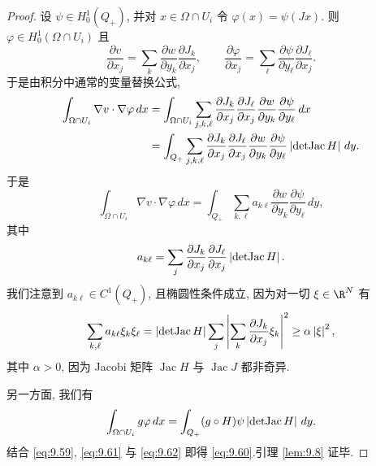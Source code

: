 \begin{proof}
设 $\psi\in H_0^1(Q_+)$, 并对 $x\in\Omega\cap U_i$ 令 $\varphi(x)=\psi(Jx)$.
则 $\varphi\in H_0^1(\Omega\cap U_i)$ 且
\begin{equation*}
\frac{\partial v}{\partial x_j}=\sum_k\frac{\partial w}{\partial y_k}
\frac{\partial J_k}{\partial x_j},\qquad
\frac{\partial\varphi}{\partial x_j}=\sum_\ell\frac{\partial\psi}{\partial y_\ell}
\frac{\partial J_\ell}{\partial x_j}.
\end{equation*}
于是由积分中通常的变量替换公式,
\begin{equation*}
\begin{aligned}
\int_{\Omega\cap U_i}\nabla v\cdot\nabla\varphi\,dx
&=\int_{\Omega\cap U_i}\sum_{j,k,\ell}\frac{\partial J_k}{\partial x_j}
\frac{\partial J_\ell}{\partial x_j}\frac{\partial w}{\partial y_k}
\frac{\partial\psi}{\partial y_\ell}\,dx\\
&=\int_{Q_+}\sum_{j,k,\ell}\frac{\partial J_k}{\partial x_j}
\frac{\partial J_\ell}{\partial x_j}\frac{\partial w}{\partial y_k}
\frac{\partial\psi}{\partial y_\ell}\left|\operatorname{detJac}H\right|\,dy.
\end{aligned}
\end{equation*}
于是
\begin{equation}
\int_{\Omega\cap U_i}\nabla v\cdot\nabla\varphi\,dx
=\int_{Q_+}\sum_{k,\ell}a_{k\ell}\frac{\partial w}{\partial y_k}
\frac{\partial\psi}{\partial y_\ell}\,dy,
\label{eq:9.61}
\end{equation}
其中
\begin{equation*}
a_{k\ell}=\sum_j\frac{\partial J_k}{\partial x_j}
\frac{\partial J_\ell}{\partial x_j}\left|\operatorname{detJac}H\right|.
\end{equation*}
我们注意到 $a_{k\ell}\in C^1(Q_+)$, 且椭圆性条件成立, 因为对一切
$\xi\in\R^N$ 有
\begin{equation*}
\sum_{k,\ell}a_{k\ell}\xi_k\xi_\ell
=\left|\operatorname{detJac}H\right|\sum_j
\left|\sum_k\frac{\partial J_k}{\partial x_j}\xi_k\right|^2
\ge\alpha\left|\xi\right|^2,
\end{equation*}
其中 $\alpha>0$, 因为 Jacobi 矩阵 $\operatorname{Jac}H$ 与
$\operatorname{Jac}J$ 都非奇异.

另一方面, 我们有
\begin{equation}
\int_{\Omega\cap U_i}g\varphi\,dx
=\int_{Q_+}(g\circ H)\psi\left|\operatorname{detJac}H\right|\,dy.
\label{eq:9.62}
\end{equation}
结合 \eqref{eq:9.59}, \eqref{eq:9.61} 与 \eqref{eq:9.62} 即得
\eqref{eq:9.60}.引理  \ref{lem:9.8} 证毕.
\end{proof}

